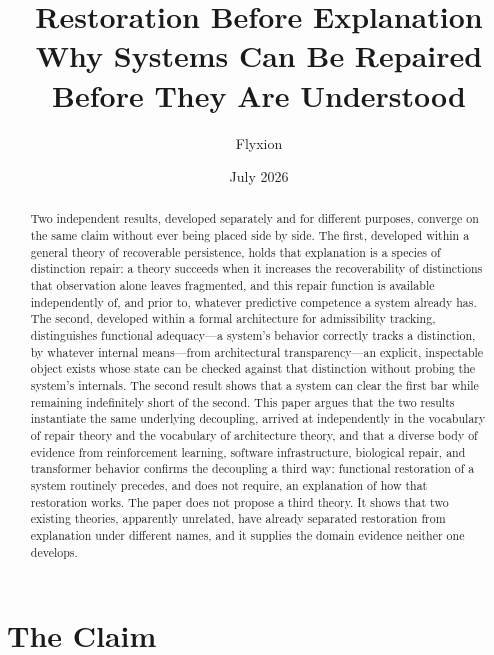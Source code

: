 \documentclass[11pt]{article}
\title{\textbf{Restoration Before Explanation}\\[0.3em]
\large Why Systems Can Be Repaired Before They Are Understood}
\author{Flyxion}
\date{July 2026}
\theoremstyle{plain}
\begin{document}
\maketitle

\begin{abstract}
\noindent
Two independent results, developed separately and for different purposes, converge on the same claim without ever being placed side by side. The first, developed within a general theory of recoverable persistence, holds that explanation is a species of distinction repair: a theory succeeds when it increases the recoverability of distinctions that observation alone leaves fragmented, and this repair function is available independently of, and prior to, whatever predictive competence a system already has. The second, developed within a formal architecture for admissibility tracking, distinguishes functional adequacy---a system's behavior correctly tracks a distinction, by whatever internal means---from architectural transparency---an explicit, inspectable object exists whose state can be checked against that distinction without probing the system's internals. The second result shows that a system can clear the first bar while remaining indefinitely short of the second. This paper argues that the two results instantiate the same underlying decoupling, arrived at independently in the vocabulary of repair theory and the vocabulary of architecture theory, and that a diverse body of evidence from reinforcement learning, software infrastructure, biological repair, and transformer behavior confirms the decoupling a third way: functional restoration of a system routinely precedes, and does not require, an explanation of how that restoration works. The paper does not propose a third theory. It shows that two existing theories, apparently unrelated, have already separated restoration from explanation under different names, and it supplies the domain evidence neither one develops.
\end{abstract}

\newpage
\tableofcontents
\bigskip

\section{The Claim}
\end{document}
